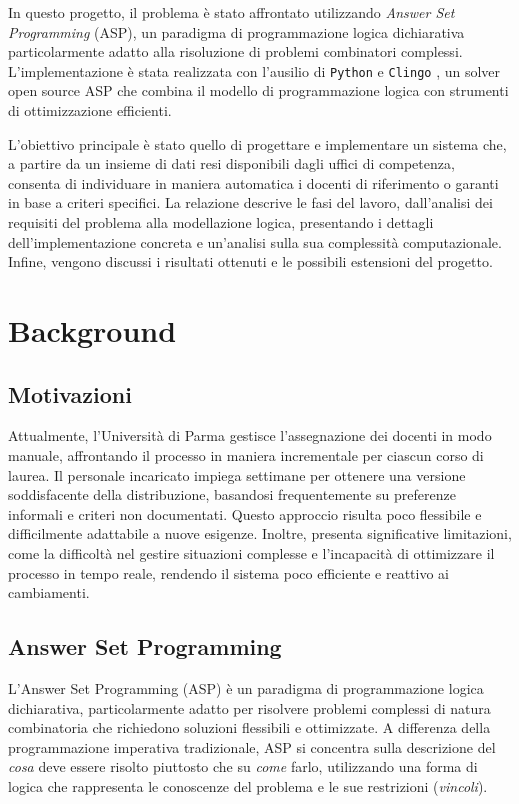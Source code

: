 \documentclass[journal]{IEEEtran}
\begin{document}
In questo progetto, il problema è stato affrontato utilizzando \textit{Answer
Set Programming} (ASP), un paradigma di programmazione logica dichiarativa
particolarmente adatto alla risoluzione di problemi combinatori complessi.
L'implementazione è stata realizzata con l'ausilio di \texttt{Python}
\cite{python} e \texttt{Clingo} \cite{clingo}, un solver open source ASP che
combina il modello di programmazione logica con strumenti di ottimizzazione
efficienti.

L'obiettivo principale è stato quello di progettare e implementare un sistema
che, a partire da un insieme di dati resi disponibili dagli uffici di
competenza, consenta di individuare in maniera automatica i docenti di
riferimento o garanti in base a criteri specifici. La relazione descrive le fasi
del lavoro, dall'analisi dei requisiti del problema alla modellazione logica,
presentando i dettagli dell'implementazione concreta e un'analisi sulla sua
complessità computazionale. Infine, vengono discussi i risultati ottenuti e le
possibili estensioni del progetto.


\section{Background}
\subsection{Motivazioni}
Attualmente, l'Università di Parma gestisce l'assegnazione dei docenti in modo
manuale, affrontando il processo in maniera incrementale per ciascun corso di
laurea. Il personale incaricato impiega settimane per ottenere una versione
soddisfacente della distribuzione, basandosi frequentemente su preferenze
informali e criteri non documentati. Questo approccio risulta poco flessibile e
difficilmente adattabile a nuove esigenze. Inoltre, presenta significative
limitazioni, come la difficoltà nel gestire situazioni complesse e l'incapacità
di ottimizzare il processo in tempo reale, rendendo il sistema poco efficiente e
reattivo ai cambiamenti.

\subsection{Answer Set Programming}
L'Answer Set Programming (ASP) è un paradigma di programmazione logica
dichiarativa, particolarmente adatto per risolvere problemi complessi di natura
combinatoria che richiedono soluzioni flessibili e ottimizzate. A differenza
della programmazione imperativa tradizionale, ASP si concentra sulla descrizione
del \textit{cosa} deve essere risolto piuttosto che su	\textit{come} farlo,
utilizzando una forma di logica che rappresenta le conoscenze del problema e le
sue restrizioni (\textit{vincoli}).
\end{document}
